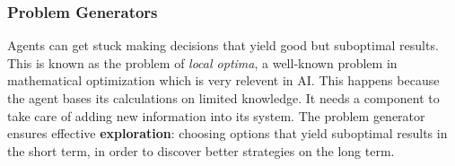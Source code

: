 \subsubsection{Problem Generators}
Agents can get stuck making decisions that yield good but suboptimal results.
This is known as the problem of \emph{local optima}, a well-known problem in mathematical optimization which is very relevent in AI.
This happens because the agent bases its calculations on limited knowledge.
It needs a component to take care of adding new information into its system.
The problem generator ensures effective \textbf{exploration}:
choosing options that yield suboptimal results in the short term, in order to discover better strategies on the long term.